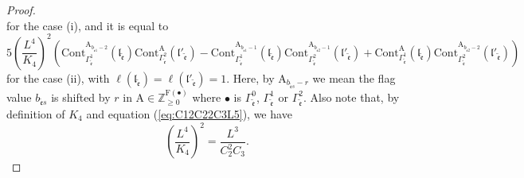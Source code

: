 \documentclass[12pt]{amsart}
\numberwithin{equation}{section}
\begin{document}
\begin{proof}
\begin{equation*}
\end{equation*}
for the case (i), and it is equal to
\begin{equation*}
5\left(\frac{L^{4}}{K_{4}}\right)^2\left(\mathrm{Cont}_{\Gamma_{\tilde{\mathfrak{e}}}^1}^{\mathrm{A}_{b_{\tilde{\mathfrak{e}}1}-2}}(\mathfrak{l}_{\tilde{\mathfrak{e}}})\mathrm{Cont}_{\Gamma_{\tilde{\mathfrak{e}}}^2}^{\mathrm{A}}(\mathfrak{l}'_{\tilde{\mathfrak{e}}})
-\mathrm{Cont}_{\Gamma_{\tilde{\mathfrak{e}}}^1}^{\mathrm{A}_{b_{\tilde{\mathfrak{e}}1}-1}}(\mathfrak{l}_{\tilde{\mathfrak{e}}})\mathrm{Cont}_{\Gamma_{\tilde{\mathfrak{e}}}^2}^{\mathrm{A}_{b_{\tilde{\mathfrak{e}}2}-1}}(\mathfrak{l}'_{\tilde{\mathfrak{e}}})
+\mathrm{Cont}_{\Gamma_{\tilde{\mathfrak{e}}}^1}^{\mathrm{A}}(\mathfrak{l}_{\tilde{\mathfrak{e}}})\mathrm{Cont}_{\Gamma_{\tilde{\mathfrak{e}}}^2}^{\mathrm{A}_{b_{\tilde{\mathfrak{e}}2}-2}}(\mathfrak{l}'_{\tilde{\mathfrak{e}}})
\right)
\end{equation*}
for the case (ii), with $\ell(\mathfrak{l}_{\tilde{\mathfrak{e}}})=\ell(\mathfrak{l}'_{\tilde{\mathfrak{e}}})=1$. Here, by $\mathrm{A}_{b_{\tilde{\mathfrak{e}}s}-r}$ we mean the flag value $b_{\tilde{\mathfrak{e}}s}$ is shifted by $r$ in $\mathrm{A}\in\mathbb{Z}_{\geq 0}^{\mathrm{F}(\bullet)}$ where $\bullet$ is $\Gamma_{\tilde{\mathfrak{e}}}^0$, $\Gamma_{\tilde{\mathfrak{e}}}^1$ or $\Gamma_{\tilde{\mathfrak{e}}}^2$. Also note that, by definition of $K_4$ and equation (\ref{eq:C12C22C3L5}), we have
\begin{equation*}
\left(\frac{L^{4}}{K_{4}}\right)^2=\frac{L^3}{C_2^2C_3}.
\end{equation*}


\end{proof}
\end{document}
